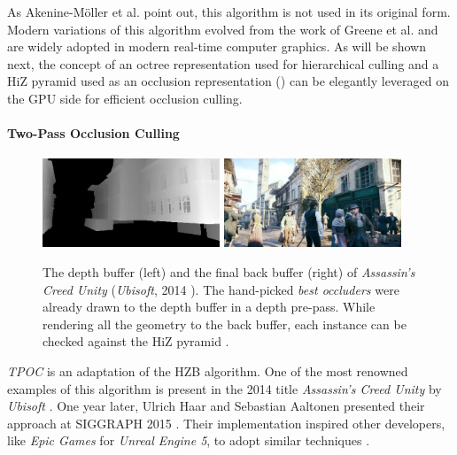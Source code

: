 \noindent 
As Akenine-Möller et al. \cite{AkenineMoeller2018} point out, this algorithm is not used in its original form. 
Modern variations of this algorithm evolved from the work of Greene et al. \cite{Greene93} and are widely adopted in 
modern real-time computer graphics. As will be shown next, the concept of an octree representation used for 
hierarchical culling and a \ac{HiZ} pyramid used as an occlusion representation (\cite{AkenineMoeller2018}) can be elegantly 
leveraged on the \ac{GPU} side for efficient occlusion culling.


\paragraph*{Two-Pass Occlusion Culling} \label{subsubsec-two-pass-occlusion-culling}

\begin{figure}[h]
    \centering
    \includegraphics[width=200px]{images/graphics/depth-buffer-ac-unity.jpg}
    \includegraphics[width=200px]{images/graphics/final-frame-ac-unity.jpg}
    \caption{The depth buffer (left) and the final back buffer (right) of \emph{Assassin's Creed Unity} (\emph{Ubisoft}, 2014 \cite{Ubisoft2014}). 
    The hand-picked \emph{best occluders} were already drawn to the depth buffer in a depth pre-pass.
    While rendering all the geometry to the back buffer, each instance can be checked against the \ac{HiZ} pyramid \cite{Kruskonja2022}.}
    \label{fig:depth-buffer-ac-unity}
\end{figure}

\noindent
\emph{\ac{TPOC}} is an adaptation of the \ac{HZB} algorithm. One of the most renowned examples of this algorithm is 
present in the 2014 title \emph{Assassin's Creed Unity} by \emph{Ubisoft} \cite{Ubisoft2014}. One year later, Ulrich 
Haar and Sebastian Aaltonen presented their approach at SIGGRAPH 2015 \cite{Aaltonen2015}. Their implementation 
inspired other developers, like \emph{Epic Games} for \emph{Unreal Engine 5}, to adopt similar techniques \cite{Karis2021}. \\
\enlargethispage{\baselineskip}
\enlargethispage{\baselineskip}

